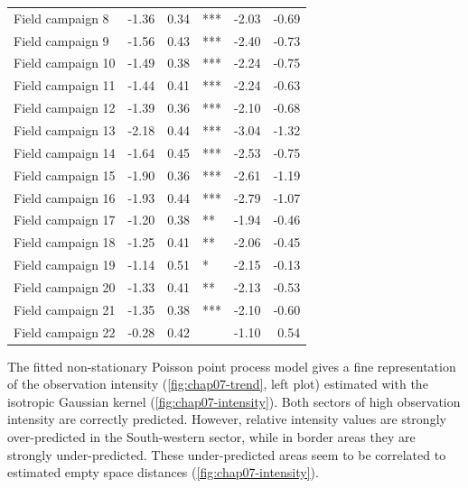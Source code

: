 \begin{table}[!ht]
\begin{tabular}{lrrlrr}
  Field campaign 8	& -1.36 	& 0.34 			& *** 	& -2.03 	& -0.69 \\ 
  Field campaign 9	& -1.56 	& 0.43 			& *** 	& -2.40 	& -0.73 \\ 
  Field campaign 10	& -1.49 	& 0.38 			& *** 	& -2.24 	& -0.75 \\ 
  Field campaign 11	& -1.44 	& 0.41 			& *** 	& -2.24 	& -0.63 \\ 
  Field campaign 12	& -1.39 	& 0.36 			& *** 	& -2.10 	& -0.68 \\ 
  Field campaign 13	& -2.18 	& 0.44 			& *** 	& -3.04 	& -1.32 \\ 
  Field campaign 14	& -1.64 	& 0.45 			& *** 	& -2.53 	& -0.75 \\ 
  Field campaign 15	& -1.90 	& 0.36 			& *** 	& -2.61 	& -1.19 \\ 
  Field campaign 16	& -1.93 	& 0.44 			& *** 	& -2.79 	& -1.07 \\ 
  Field campaign 17	& -1.20 	& 0.38 			& ** 	& -1.94 	& -0.46 \\ 
  Field campaign 18	& -1.25 	& 0.41			& ** 	& -2.06 	& -0.45 \\ 
  Field campaign 19	& -1.14 	& 0.51 			& * 	& -2.15 	& -0.13 \\ 
  Field campaign 20	& -1.33 	& 0.41 			& ** 	& -2.13 	& -0.53 \\ 
  Field campaign 21	& -1.35 	& 0.38 			& *** 	& -2.10 	& -0.60 \\ 
  Field campaign 22	& -0.28 	& 0.42 			&    	& -1.10 	& 0.54 	\\ 
  \hline
 \end{tabular}
\end{table}

The fitted non-stationary Poisson point process model gives a fine representation of the observation intensity 
(\autoref{fig:chap07-trend}, left plot) estimated with the isotropic Gaussian kernel 
(\autoref{fig:chap07-intensity}). Both sectors of high observation intensity are correctly predicted. However, 
relative intensity values are strongly over-predicted in the South-western sector, while in border areas they 
are strongly under-predicted. These under-predicted areas seem to be correlated to estimated empty space 
distances (\autoref{fig:chap07-intensity}).

